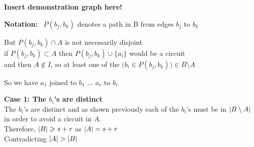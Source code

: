 \documentclass{article}
\theoremstyle{plain}
\theoremstyle{definition}
\theoremstyle{remark}
\newcommand\Notation{%
  \textbf{Notation:}~%
}
\begin{document}
 \textbf{Insert demonstration graph here!}
 
 \vspace{2mm}
 
 \begin{minipage}{.2\textwidth}
 \end{minipage}
\hspace{5cm}  \begin{minipage}{.2\textwidth}
 \end{minipage}
 
 \vspace{2mm}
 
 \noindent\Notation $ P ( b_j, b_k ) $ denotes a path in B from edges $ b_j $ to $ b_k $
 
 \vspace{2mm}
 
\noindent But $ P(b_j,b_k) \cap A $ is not necessarily disjoint\\
\noindent if $ P(b_j,b_k) \subset A  $ then $ P(b_j,b_k) \cup \{ a_i \} $  would be a circuit\\ and then $ A \notin I $, so at least one of the $ \big( b_i \in P(b_j,b_k) \big) \in B \setminus A $
 
 \vspace{4mm}
 
 \noindent So we have $ a_1 $ joined to $ b_1$ ... $ a_r $ to $ b_r $
 
 \vspace{2mm}
 
 \noindent\textbf{Case 1: The $ b_i$'s are distinct}\\
 The $ b_i$'s are distinct and as shown previously each of the $ b_i$'s must be in $ \abs{B \setminus A} $ in order to avoid a circuit in $ A $.\\ 
\noindent Therefore,
  $ \abs{B} \geqslant s + r $ as $ \abs{A}  = s + r $ \\Contradicting $ \abs{A}  >  \abs{B} $
 
\end{document}
